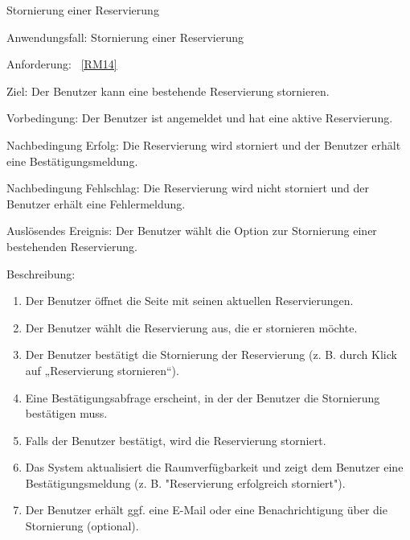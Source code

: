 \begin{function}{70}{Stornierung einer Reservierung}
    \item[Anwendungsfall:] Stornierung einer Reservierung
    \item[Anforderung:] ~\ref{RM14}
    \item[Ziel:] Der Benutzer kann eine bestehende Reservierung stornieren.
    \item[Vorbedingung:] Der Benutzer ist angemeldet und hat eine aktive Reservierung.
    \item[Nachbedingung Erfolg:] Die Reservierung wird storniert und der Benutzer erhält eine Bestätigungsmeldung.
    \item[Nachbedingung Fehlschlag:] Die Reservierung wird nicht storniert und der Benutzer erhält eine Fehlermeldung.
    \item[Auslösendes Ereignis:] Der Benutzer wählt die Option zur Stornierung einer bestehenden Reservierung.
    \item[Beschreibung:] ~
    \begin{enumerate}
        \item Der Benutzer öffnet die Seite mit seinen aktuellen Reservierungen.
        \item Der Benutzer wählt die Reservierung aus, die er stornieren möchte.
        \item Der Benutzer bestätigt die Stornierung der Reservierung (z. B. durch Klick auf „Reservierung stornieren“).
        \item Eine Bestätigungsabfrage erscheint, in der der Benutzer die Stornierung bestätigen muss.
        \item Falls der Benutzer bestätigt, wird die Reservierung storniert.
        \item Das System aktualisiert die Raumverfügbarkeit und zeigt dem Benutzer eine Bestätigungsmeldung (z. B. "Reservierung erfolgreich storniert").
        \item Der Benutzer erhält ggf. eine E-Mail oder eine Benachrichtigung über die Stornierung (optional).
    \end{enumerate}
\end{function}
